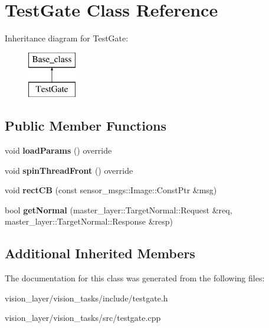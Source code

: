 \hypertarget{classTestGate}{}\section{Test\+Gate Class Reference}
\label{classTestGate}
Inheritance diagram for Test\+Gate\+:\begin{figure}[H]
\begin{center}
\leavevmode
\includegraphics[height=2.000000cm]{classTestGate}
\end{center}
\end{figure}
\subsection*{Public Member Functions}
\begin{DoxyCompactItemize}
\item 
\mbox{\label{classTestGate_a19ec359e708edfd7898bd675fb76f6e9}} 
void {\bfseries load\+Params} () override
\item 
\mbox{\label{classTestGate_a26e537037c1f2be5ed47311871ff17f9}} 
void {\bfseries spin\+Thread\+Front} () override
\item 
\mbox{\label{classTestGate_acba3279746f684c8217c3e50275f75ab}} 
void {\bfseries rect\+CB} (const sensor\+\_\+msgs\+::\+Image\+::\+Const\+Ptr \&msg)
\item 
\mbox{\label{classTestGate_a5882cb045c129adaf0e66cf87bc35d1b}} 
bool {\bfseries get\+Normal} (master\+\_\+layer\+::\+Target\+Normal\+::\+Request \&req, master\+\_\+layer\+::\+Target\+Normal\+::\+Response \&resp)
\end{DoxyCompactItemize}
\subsection*{Additional Inherited Members}


The documentation for this class was generated from the following files\+:\begin{DoxyCompactItemize}
\item 
vision\+\_\+layer/vision\+\_\+tasks/include/testgate.\+h\item 
vision\+\_\+layer/vision\+\_\+tasks/src/testgate.\+cpp\end{DoxyCompactItemize}
